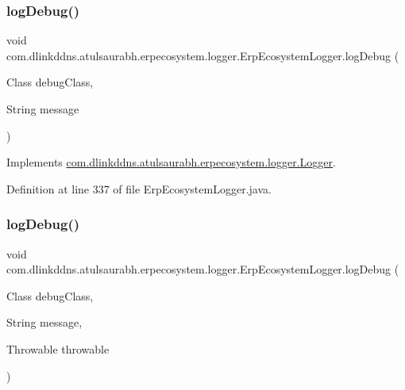 \subsubsection{\texorpdfstring{log\+Debug()}{logDebug()}\hspace{0.1cm}{\footnotesize\ttfamily [2/3]}}
{\footnotesize\ttfamily void com.\+dlinkddns.\+atulsaurabh.\+erpecosystem.\+logger.\+Erp\+Ecosystem\+Logger.\+log\+Debug (\begin{DoxyParamCaption}\item[{Class}]{debug\+Class,  }\item[{String}]{message }\end{DoxyParamCaption})}



Implements \mbox{\hyperlink{interfacecom_1_1dlinkddns_1_1atulsaurabh_1_1erpecosystem_1_1logger_1_1_logger_a8e94c010b6e08d96550a8ddc4b2f408e}{com.\+dlinkddns.\+atulsaurabh.\+erpecosystem.\+logger.\+Logger}}.



Definition at line 337 of file Erp\+Ecosystem\+Logger.\+java.

\mbox{\label{classcom_1_1dlinkddns_1_1atulsaurabh_1_1erpecosystem_1_1logger_1_1_erp_ecosystem_logger_a40e19afc6e72a31339e4eec00132c166}} 
\subsubsection{\texorpdfstring{log\+Debug()}{logDebug()}\hspace{0.1cm}{\footnotesize\ttfamily [3/3]}}
{\footnotesize\ttfamily void com.\+dlinkddns.\+atulsaurabh.\+erpecosystem.\+logger.\+Erp\+Ecosystem\+Logger.\+log\+Debug (\begin{DoxyParamCaption}\item[{Class}]{debug\+Class,  }\item[{String}]{message,  }\item[{Throwable}]{throwable }\end{DoxyParamCaption})}



